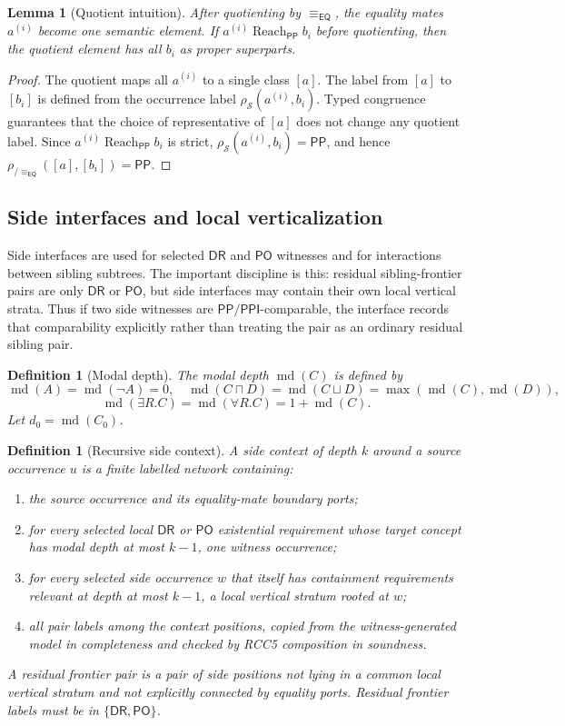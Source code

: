 \documentclass[11pt]{article}
\newtheorem{lemma}[theorem]{Lemma}
\newtheorem{definition}[theorem]{Definition}
\newcommand{\EQ}{\mathsf{EQ}}
\newcommand{\DR}{\mathsf{DR}}
\newcommand{\PO}{\mathsf{PO}}
\newcommand{\PP}{\mathsf{PP}}
\newcommand{\PPI}{\mathsf{PPI}}
\newcommand{\md}{\operatorname{md}}
\newcommand{\eqc}{\equiv_{\EQ}}
\newcommand{\reach}{\operatorname{Reach}}
\begin{document}
\begin{lemma}[Quotient intuition]\label{lem:split-copy-intuition}
After quotienting by $\eqc$, the equality mates $a^{(i)}$ become one semantic element.  If $a^{(i)}\reach_\PP b_i$ before quotienting, then the quotient element has all $b_i$ as proper superparts.
\end{lemma}

\begin{proof}
The quotient maps all $a^{(i)}$ to a single class $[a]$.  The label from $[a]$ to $[b_i]$ is defined from the occurrence label $\rho_\mathcal S(a^{(i)},b_i)$.  Typed congruence guarantees that the choice of representative of $[a]$ does not change any quotient label.  Since $a^{(i)}\reach_\PP b_i$ is strict, $\rho_\mathcal S(a^{(i)},b_i)=\PP$, and hence $\rho_{/\eqc}([a],[b_i])=\PP$.
\end{proof}

\subsection{Side interfaces and local verticalization}

Side interfaces are used for selected $\DR$ and $\PO$ witnesses and for interactions between sibling subtrees.  The important discipline is this: residual sibling-frontier pairs are only $\DR$ or $\PO$, but side interfaces may contain their own local vertical strata.  Thus if two side witnesses are $\PP/\PPI$-comparable, the interface records that comparability explicitly rather than treating the pair as an ordinary residual sibling pair.

\begin{definition}[Modal depth]
The modal depth $\md(C)$ is defined by
\[
\md(A)=\md(\neg A)=0,
\quad
\md(C\sqcap D)=\md(C\sqcup D)=\max(\md(C),\md(D)),
\]
\[
\md(\exists R.C)=\md(\forall R.C)=1+\md(C).
\]
Let $d_0=\md(C_0)$.
\end{definition}

\begin{definition}[Recursive side context]\label{def:side-context}
A side context of depth $k$ around a source occurrence $u$ is a finite labelled network containing:
\begin{enumerate}[label=(SCtx\arabic*)]
\item the source occurrence and its equality-mate boundary ports;
\item for every selected local $\DR$ or $\PO$ existential requirement whose target concept has modal depth at most $k-1$, one witness occurrence;
\item for every selected side occurrence $w$ that itself has containment requirements relevant at depth at most $k-1$, a local vertical stratum rooted at $w$;
\item all pair labels among the context positions, copied from the witness-generated model in completeness and checked by RCC5 composition in soundness.
\end{enumerate}
A residual frontier pair is a pair of side positions not lying in a common local vertical stratum and not explicitly connected by equality ports.  Residual frontier labels must be in $\{\DR,\PO\}$.
\end{definition}
\end{document}
